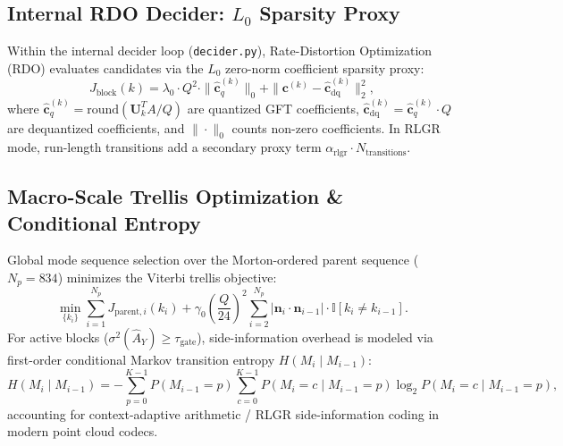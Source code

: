\documentclass[11pt,a4paper]{article}
\begin{document}
\subsection{Internal RDO Decider: $L_0$ Sparsity Proxy}
Within the internal decider loop (\texttt{decider.py}), Rate-Distortion Optimization (RDO) evaluates candidates via the $L_0$ zero-norm coefficient sparsity proxy:
\begin{equation}
  J_{\text{block}}(k) = \lambda_0 \cdot Q^2 \cdot \|\hat{\mathbf{c}}_q^{(k)}\|_0 + \|\mathbf{c}^{(k)} - \hat{\mathbf{c}}_{\text{dq}}^{(k)}\|_2^2,
\end{equation}
where $\hat{\mathbf{c}}_q^{(k)} = \text{round}(\mathbf{U}_k^T A / Q)$ are quantized GFT coefficients, $\hat{\mathbf{c}}_{\text{dq}}^{(k)} = \hat{\mathbf{c}}_q^{(k)} \cdot Q$ are dequantized coefficients, and $\|\cdot\|_0$ counts non-zero coefficients. In RLGR mode, run-length transitions add a secondary proxy term $\alpha_{\text{rlgr}} \cdot N_{\text{transitions}}$.

\subsection{Macro-Scale Trellis Optimization \& Conditional Entropy}
Global mode sequence selection over the Morton-ordered parent sequence ($N_p = 834$) minimizes the Viterbi trellis objective:
\begin{equation}
  \min_{\{k_i\}} \sum_{i=1}^{N_p} J_{\text{parent},i}(k_i) + \gamma_0 \left(\frac{Q}{24}\right)^2 \sum_{i=2}^{N_p} |\mathbf{n}_i \cdot \mathbf{n}_{i-1}| \cdot \mathbb{I}[k_i \ne k_{i-1}].
\end{equation}
For active blocks ($\sigma^2(\hat{A}_Y) \ge \tau_{\text{gate}}$), side-information overhead is modeled via first-order conditional Markov transition entropy $H(M_i \mid M_{i-1})$:
\begin{equation}
  H(M_i \mid M_{i-1}) = -\sum_{p=0}^{K-1} P(M_{i-1}=p) \sum_{c=0}^{K-1} P(M_i=c \mid M_{i-1}=p) \log_2 P(M_i=c \mid M_{i-1}=p),
\end{equation}
accounting for context-adaptive arithmetic / RLGR side-information coding in modern point cloud codecs.
\end{document}
